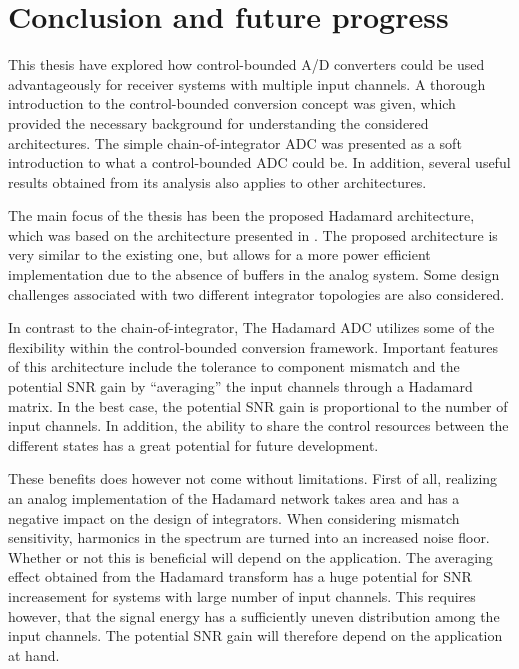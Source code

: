 
\chapter{Conclusion and future progress}
\label{sec:conclusion}
This thesis have explored how control-bounded A/D converters could be used advantageously for receiver systems with multiple input channels. A thorough introduction to the control-bounded conversion concept was given, which provided the necessary background for understanding the considered architectures. The simple chain-of-integrator ADC was presented as a soft introduction to what a control-bounded ADC could be. In addition, several useful results obtained from its analysis also applies to other architectures.

The main focus of the thesis has been the proposed Hadamard architecture, which was based on the architecture presented in \cite{malmberg_thesis}. The proposed architecture is very similar to the existing one, but allows for a more power efficient implementation due to the absence of buffers in the analog system. Some design challenges associated with two different integrator topologies are also considered.

In contrast to the chain-of-integrator, The Hadamard ADC utilizes some of the flexibility within the control-bounded conversion framework. Important features of this architecture include the tolerance to component mismatch and the potential SNR gain by \enquote{averaging} the input channels through a Hadamard matrix. In the best case, the potential SNR gain is proportional to the number of input channels. In addition, the ability to share the control resources between the different states has a great potential for future development.

These benefits does however not come without limitations. First of all, realizing an analog implementation of the Hadamard network takes area and has a negative impact on the design of integrators. When considering mismatch sensitivity, harmonics in the spectrum are turned into an increased noise floor. Whether or not this is beneficial will depend on the application. The averaging effect obtained from the Hadamard transform has a huge potential for SNR increasement for systems with large number of input channels. This requires however, that the signal energy has a sufficiently uneven distribution among the input channels. The potential SNR gain will therefore depend on the application at hand.

